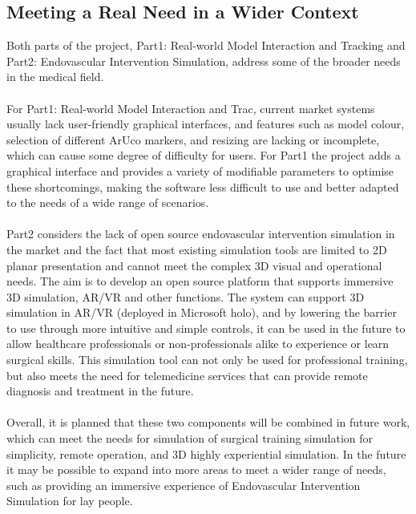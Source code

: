 \documentclass[12pt]{article}
\begin{document}
\subsection{Meeting a Real Need in a Wider Context}
Both parts of the project, Part1: Real-world Model Interaction and Tracking and Part2: Endovascular Intervention Simulation, address some of the broader needs in the medical field.
\\\\
For Part1: Real-world Model Interaction and Trac, current market systems usually lack user-friendly graphical interfaces, and features such as model colour, selection of different ArUco markers, and resizing are lacking or incomplete, which can cause some degree of difficulty for users. For Part1 the project adds a graphical interface and provides a variety of modifiable parameters to optimise these shortcomings, making the software less difficult to use and better adapted to the needs of a wide range of scenarios.
\\\\
Part2 considers the lack of open source endovascular intervention simulation in the market and the fact that most existing simulation tools are limited to 2D planar presentation and cannot meet the complex 3D visual and operational needs. The aim is to develop an open source platform that supports immersive 3D simulation, AR/VR and other functions. The system can support 3D simulation in AR/VR (deployed in Microsoft \gls{holo}), and by lowering the barrier to use through more intuitive and simple controls, it can be used in the future to allow healthcare professionals or non-professionals alike to experience or learn surgical skills. This simulation tool can not only be used for professional training, but also meets the need for telemedicine services that can provide remote diagnosis and treatment in the future.
\\\\
Overall, it is planned that these two components will be combined in future work, which can meet the needs for simulation of surgical training simulation for simplicity, remote operation, and 3D highly experiential simulation. In the future it may be possible to expand into more areas to meet a wider range of needs, such as providing an immersive experience of Endovascular Intervention Simulation for lay people.
\end{document}
